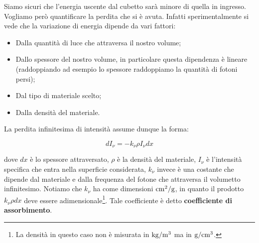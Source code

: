 \begin{figure}[H]
   \centering
\end{figure}

Siamo sicuri che l'energia uscente dal cubetto sarà minore di quella in ingresso. Vogliamo però quantificare la perdita che si è avuta. Infatti sperimentalmente si vede che la variazione di energia dipende da vari fattori:
    
\begin{itemize}
   \item Dalla quantità di luce che attraversa il nostro volume;
   \item Dallo spessore del nostro volume, in particolare questa dipendenza è lineare (raddoppiando ad esempio lo spessore raddoppiamo la quantità di fotoni persi);
   \item Dal tipo di materiale scelto;
   \item Dalla densità del materiale.
\end{itemize}

La perdita infinitesima di intensità assume dunque la forma:

\begin{equation}
   dI_{\nu}=-k_{\nu} \rho I_{\nu} dx
\end{equation}

dove $dx$ è lo spessore attraversato, $\rho$ è la densità del materiale, $I_{\nu}$ è l'intensità specifica che entra nella superficie considerata, $k_{\nu}$ invece è una costante che dipende dal materiale e dalla frequenza del fotone che attraversa il volumetto infinitesimo. Notiamo che $k_{\nu}$ ha come dimensioni $\rm cm^2/g$, in quanto il prodotto $k_{\nu} \rho dx$ deve essere adimensionale\footnote{La densità in questo caso non è misurata in $\rm kg/m^3$ ma in $\rm g/cm^3$.}. Tale coefficiente è detto \textbf{coefficiente di assorbimento}.

